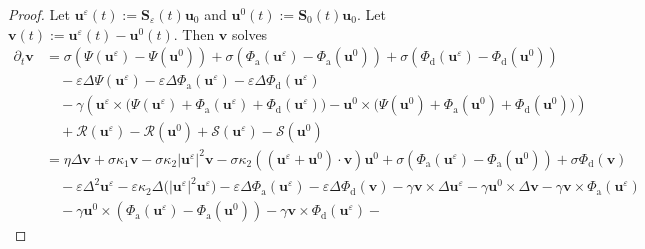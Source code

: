 \documentclass[11pt, reqno]{amsart}
\theoremstyle{definition}
\numberwithin{equation}{section}
\newcommand{\bff}{\boldsymbol}
\begin{document}
\begin{proof}
Let $\bff{u}^\varepsilon(t):= \bff{S}_\varepsilon(t) \bff{u}_0$ and $\bff{u}^0(t):= \bff{S}_0(t) \bff{u}_0$. Let $\bff{v}(t):= \bff{u}^\varepsilon(t)- \bff{u}^0(t)$. Then $\bff{v}$ solves
\begin{align}\label{equ:dtv eq}
    \partial_t \bff{v}
    &=
    \sigma \left(\Psi(\bff{u}^\varepsilon)-\Psi(\bff{u}^0)\right)
    +
    \sigma \left(\Phi_{\mathrm{a}}(\bff{u}^\varepsilon)- \Phi_{\mathrm{a}}(\bff{u}^0) \right)
    +
    \sigma \left(\Phi_{\mathrm{d}}(\bff{u}^\varepsilon)- \Phi_{\mathrm{d}}(\bff{u}^0) \right)
    \nonumber\\
    &\quad
    -
    \varepsilon \Delta \Psi(\bff{u}^\varepsilon)
    -
    \varepsilon \Delta \Phi_{\mathrm{a}}(\bff{u}^\varepsilon) 
    -
    \varepsilon \Delta \Phi_{\mathrm{d}}(\bff{u}^\varepsilon)
    \nonumber\\
    &\quad
    -
    \gamma \left( \bff{u}^\varepsilon \times \big(\Psi(\bff{u}^\varepsilon)+ \Phi_{\mathrm{a}}(\bff{u}^\varepsilon)+ \Phi_{\mathrm{d}}(\bff{u}^\varepsilon)\big) - \bff{u}^0 \times \big(\Psi(\bff{u}^0)+ \Phi_{\mathrm{a}}(\bff{u}^0)+ \Phi_{\mathrm{d}}(\bff{u}^0)\big) \right)
    \nonumber \\
    &\quad
    +
    \mathcal{R}(\bff{u}^\varepsilon)- \mathcal{R}(\bff{u}^0)
    +
    \mathcal{S}(\bff{u}^\varepsilon)- \mathcal{S}(\bff{u}^0)
    \nonumber\\
    &=
    \eta \Delta \bff{v}
    +
    \sigma \kappa_1 \bff{v}
    -
    \sigma \kappa_2 |\bff{u}^\varepsilon|^2 \bff{v}
    -
    \sigma \kappa_2 \left((\bff{u}^\varepsilon+ \bff{u}^0)\cdot \bff{v}\right) \bff{u}^0
    +
    \sigma \left(\Phi_{\mathrm{a}}(\bff{u}^\varepsilon)- \Phi_{\mathrm{a}}(\bff{u}^0) \right)
    +
    \sigma \Phi_{\mathrm{d}}(\bff{v})
    \nonumber\\
    &\quad
    -\varepsilon \Delta^2 \bff{u}^\varepsilon
    -
    \varepsilon\kappa_2 \Delta\big(|\bff{u}^\varepsilon|^2 \bff{u}^\varepsilon \big)
    -
    \varepsilon \Delta \Phi_{\mathrm{a}}(\bff{u}^\varepsilon)
    -
    \varepsilon \Delta \Phi_{\mathrm{d}}(\bff{v}) 
    -
    \gamma \bff{v}\times \Delta \bff{u}^\varepsilon
    -
    \gamma \bff{u}^0 \times \Delta \bff{v}
    -
    \gamma \bff{v}\times \Phi_{\mathrm{a}}(\bff{u}^\varepsilon)
    \nonumber\\
    &\quad
    -
    \gamma \bff{u}^0 \times \left(\Phi_{\mathrm{a}}(\bff{u}^\varepsilon)- \Phi_{\mathrm{a}}(\bff{u}^0)\right)
    -
    \gamma \bff{v}\times \Phi_{\mathrm{d}}(\bff{u}^\varepsilon)
    -

\end{align}
\end{proof}
\end{document}
